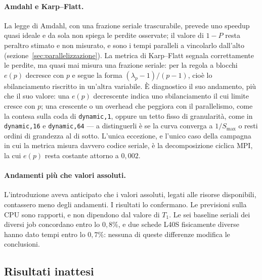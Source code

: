 \paragraph{Amdahl e Karp--Flatt.}
La legge di Amdahl, con una frazione seriale trascurabile, prevede uno speedup
quasi ideale e da sola non spiega le perdite osservate; il valore di $1-P$ resta
peraltro stimato e non misurato, e sono i tempi paralleli a vincolarlo
dall'alto (sezione~\ref{sec:parallelizzazione}). La metrica di Karp--Flatt
segnala correttamente le perdite, ma quasi mai misura una frazione seriale: per
la regola a blocchi $e(p)$ decresce con $p$ e segue la forma
$(\lambda_p-1)/(p-1)$, cioè lo sbilanciamento riscritto in un'altra variabile. È
diagnostico il suo andamento, più che il suo valore: una $e(p)$ decrescente
indica uno sbilanciamento il cui limite cresce con $p$; una crescente o un
overhead che peggiora con il parallelismo, come la contesa sulla coda di
\texttt{dynamic,1}, oppure un tetto fisso di granularità, come in
\texttt{dynamic,16} e \texttt{dynamic,64} --- a distinguerli è se la curva
converga a $1/S_{\max}$ o resti ordini di grandezza al di sotto. L'unica
eccezione, e l'unico caso della campagna in cui la metrica misura davvero codice
seriale, è la decomposizione ciclica MPI, la cui $e(p)$ resta costante attorno a
$0{,}002$.

\paragraph{Andamenti più che valori assoluti.}
L'introduzione aveva anticipato che i valori assoluti, legati alle risorse
disponibili, contassero meno degli andamenti. I risultati lo confermano. Le
previsioni sulla CPU sono rapporti, e non dipendono dal valore di $T_1$. Le sei
baseline seriali dei diversi job concordano entro lo $0{,}8\%$, e due schede
L40S fisicamente diverse hanno dato tempi entro lo $0{,}7\%$: nessuna di queste
differenze modifica le conclusioni.

\subsection{Risultati inattesi}

